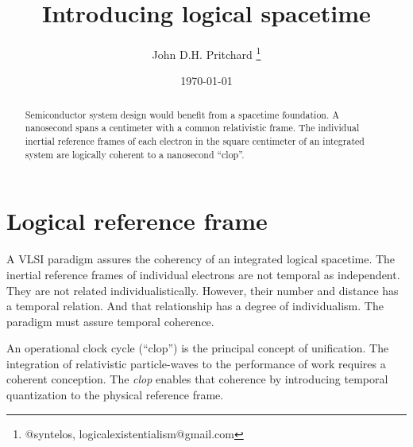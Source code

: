 \documentclass[12pt,twocolumn]{article}
\begin{document}
\title{Introducing logical spacetime}

\author{John D.H. Pritchard \thanks{@syntelos, logicalexistentialism@gmail.com}}

\date{\today}

\maketitle


\begin{abstract}

Semiconductor system design would benefit from a spacetime foundation.
A nanosecond spans a centimeter with a common relativistic frame.  The
individual inertial reference frames of each electron in the square
centimeter of an integrated system are logically coherent to a
nanosecond ``clop''.
  
\end{abstract}


\section{Logical reference frame}

A VLSI paradigm assures the coherency of an integrated logical
spacetime.  The inertial reference frames of individual electrons are
not temporal as independent.  They are not related
individualistically.  However, their number and distance has a
temporal relation.  And that relationship has a degree of
individualism.  The paradigm must assure temporal coherence.

An operational clock cycle (``clop'') is the principal concept of
unification.  The integration of relativistic particle-waves to the
performance of work requires a coherent conception.  The {\it clop}
enables that coherence by introducing temporal quantization to the
physical reference frame.  



%
%

\end{document}
